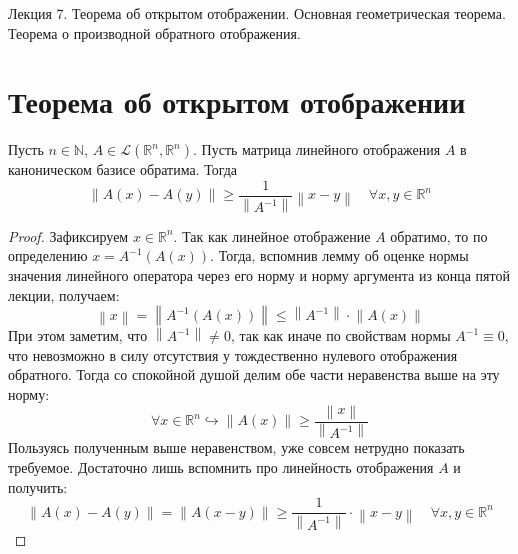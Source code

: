 \documentclass[11pt]{article}
\begin{document}
\begin{titlepage}
    \centering
    \vspace*{\fill}  %

    {\Huge Лекция 7. Теорема об открытом отображении. Основная геометрическая теорема. Теорема о производной обратного отображения.
    \par}

    \vspace*{\fill}  %
\end{titlepage}

\setcounter{page}{1}

\section{Теорема об открытом отображении}

\begin{lemma}
    Пусть $n \in \mathbb{N}$, $A \in \mathcal{L}\left(\mathbb{R}^n, \mathbb{R}^n\right)$. Пусть матрица линейного отображения $A$ в каноническом базисе обратима. Тогда
    \[\left\lVert A(x) - A(y) \right\rVert \geq \frac{1}{\left\lVert A^{-1} \right\rVert} \left\lVert x - y \right\rVert \quad \forall x, y \in \mathbb{R}^n\]
\end{lemma}

\begin{proof}
    Зафиксируем $x \in \mathbb{R}^n$. Так как линейное отображение $A$ обратимо, то по определению $x = A^{-1} (A(x))$. Тогда, 
    вспомнив лемму об оценке нормы значения линейного оператора через его норму и норму аргумента из конца пятой лекции, получаем:
    \[\left\lVert x \right\rVert = \left\lVert A^{-1} (A(x)) \right\rVert \leq \left\lVert A^{-1} \right\rVert \cdot \left\lVert A(x) \right\rVert\]
    При этом заметим, что $\left\lVert A^{-1} \right\rVert \neq 0$, так как иначе по свойствам нормы $A^{-1} \equiv 0$, что невозможно в силу отсутствия у тождественно нулевого отображения обратного.
    Тогда со спокойной душой делим обе части неравенства выше на эту норму:
    \[\forall x \in \mathbb{R}^n \hookrightarrow \left\lVert A(x) \right\rVert \geq \frac{\left\lVert x \right\rVert}{\left\lVert A^{-1} \right\rVert}\]
    Пользуясь полученным выше неравенством, уже совсем нетрудно показать требуемое. Достаточно лишь 
    вспомнить про линейность отображения $A$ и получить:
    \[\left\lVert A(x) - A(y) \right\rVert = \left\lVert A(x - y) \right\rVert \geq \frac{1}{\left\lVert A^{-1} \right\rVert} \cdot \left\lVert x - y \right\rVert \quad \forall x, y \in \mathbb{R}^n\]
\end{proof}
\end{document}
